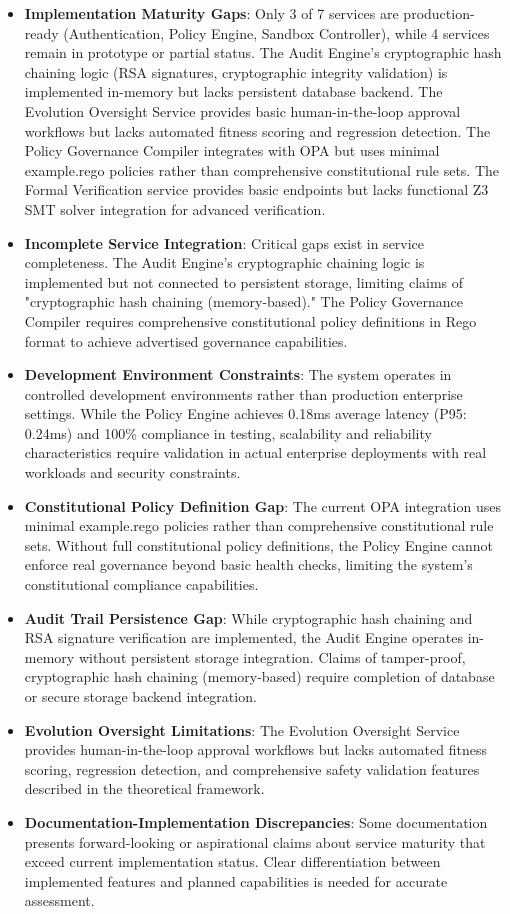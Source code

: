 \documentclass[manuscript,screen,9pt]{acmart}
\begin{document}
\begin{itemize}[leftmargin=*,itemsep=1pt,parsep=1pt]
    \item \textbf{Implementation Maturity Gaps}: Only 3 of 7 services are production-ready (Authentication, Policy Engine, Sandbox Controller), while 4 services remain in prototype or partial status. The Audit Engine's cryptographic hash chaining logic (RSA signatures, cryptographic integrity validation) is implemented in-memory but lacks persistent database backend. The Evolution Oversight Service provides basic human-in-the-loop approval workflows but lacks automated fitness scoring and regression detection. The Policy Governance Compiler integrates with OPA but uses minimal example.rego policies rather than comprehensive constitutional rule sets. The Formal Verification service provides basic endpoints but lacks functional Z3 SMT solver integration for advanced verification.
    \item \textbf{Incomplete Service Integration}: Critical gaps exist in service completeness. The Audit Engine's cryptographic chaining logic is implemented but not connected to persistent storage, limiting claims of "cryptographic hash chaining (memory-based)." The Policy Governance Compiler requires comprehensive constitutional policy definitions in Rego format to achieve advertised governance capabilities.
    \item \textbf{Development Environment Constraints}: The system operates in controlled development environments rather than production enterprise settings. While the Policy Engine achieves 0.18ms average latency (P95: 0.24ms) and 100\% compliance in testing, scalability and reliability characteristics require validation in actual enterprise deployments with real workloads and security constraints.
    \item \textbf{Constitutional Policy Definition Gap}: The current OPA integration uses minimal example.rego policies rather than comprehensive constitutional rule sets. Without full constitutional policy definitions, the Policy Engine cannot enforce real governance beyond basic health checks, limiting the system's constitutional compliance capabilities.
    \item \textbf{Audit Trail Persistence Gap}: While cryptographic hash chaining and RSA signature verification are implemented, the Audit Engine operates in-memory without persistent storage integration. Claims of tamper-proof, cryptographic hash chaining (memory-based) require completion of database or secure storage backend integration.
    \item \textbf{Evolution Oversight Limitations}: The Evolution Oversight Service provides human-in-the-loop approval workflows but lacks automated fitness scoring, regression detection, and comprehensive safety validation features described in the theoretical framework.
    \item \textbf{Documentation-Implementation Discrepancies}: Some documentation presents forward-looking or aspirational claims about service maturity that exceed current implementation status. Clear differentiation between implemented features and planned capabilities is needed for accurate assessment.
\end{itemize}
\end{document}
